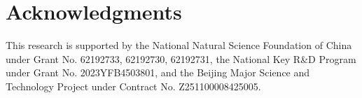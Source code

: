 \documentclass{article}
\theoremstyle{definition}
\theoremstyle{remark}
\begin{document}
\section*{Acknowledgments}
This research is supported by the National Natural Science Foundation of China under Grant No. 62192733, 62192730, 62192731, the National Key R\&D Program under Grant No. 2023YFB4503801, and the Beijing Major Science and Technology Project under Contract No. Z251100008425005.





\end{document}
